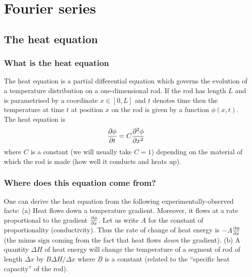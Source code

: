 \chapter{Fourier series}


%
%

\section{The heat equation}

\subsection{What is the heat equation}

The heat equation is a partial differential equation which governs the evolution of a temperature distribution on a one-dimensional rod. If the rod has length $L$ and is parametrised by a coordinate $x\in[0,L]$ and $t$ denotes time then the temperature at time $t$ at position $x$ on the rod is given by a function $\phi(x,t)$. The heat equation is
\[\frac{\partial \phi}{\partial t}=C\frac{\partial^2 \phi}{\partial x ^2}\]
where $C$ is a constant (we will usually take $C=1$) depending on the material of which the rod is made (how well it conducts and heats up).

\subsection{Where does this equation come from?}

One can derive the heat equation from the following experimentally-observed facts: (a) Heat flows down a temperature gradient. Moreover, it flows at a rate proportional to the gradient $\frac{\partial \phi}{\partial x}$. Let us write $A$ for the constant of proportionality (conductivity). Thus the rate of change of heat energy is $-A\frac{\partial \phi}{\partial x}$ (the minus sign coming from the fact that heat flows {\em down} the gradient). (b) A quantity $\Delta H$ of heat energy will change the temperature of a segment of rod of length $\Delta x$ by $B\Delta H/\Delta x$ where $B$ is a constant (related to the ``specific heat capacity'' of the rod).

